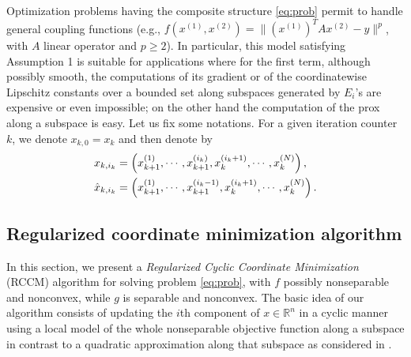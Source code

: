 \documentclass[lettersize,journal]{IEEEtran}
\newcommand{\xkik}{{x}_{k,i_{k}}}
\newcommand{\hxkik}{\hat{x}_{k,i_{k}}}
\begin{document}
\noindent  Optimization problems having the composite structure \eqref{eq:prob}
permit to handle general coupling functions (e.g.,  $f(x^{(1)}, x^{(2)})= \|(x^{(1)})^TA x^{(2)} - y\|^p$, with $A$ linear operator and $p\geq 2$). In particular, this model satisfying Assumption 1 is suitable for applications where for the first term, although possibly smooth, the computations of its gradient or of the coordinatewise Lipschitz constants over a bounded set along  subspaces generated by $E_i$'s are expensive or even impossible; on the other hand the computation of the prox  along a subspace is easy.  Let us fix some notations.  For a given iteration counter $k$, we denote $x_{k,0} = x_{k}$ and then denote by
    \vspace{-0.2cm}
    \begin{align*}
    & \xkik= \left(x_{k+1}^{(1)},\cdots,x_{k+1}^{(i_{k})},x_{k}^{(i_{k}+1)}, \cdots, x_{k}^{(N)}\right),\\
   & \hxkik = \left(x_{k+1}^{(1)},\cdots,x_{k+1}^{(i_{k}-1)},x_{k}^{(i_{k}+1)}, \cdots, x_{k}^{(N)}\right).
    \vspace{-0.2cm}
    \end{align*}



\subsection{Regularized coordinate minimization algorithm}
\noindent In this section, we present a \textit{Regularized Cyclic Coordinate  Minimization}  (RCCM) algorithm for solving problem \eqref{eq:prob},  with $f$  possibly nonseparable and nonconvex, while $g$ is separable and nonconvex. The basic idea of our algorithm consists of updating  the $i$th component of  $x\in\mathbb{R}^{n}$   in a cyclic manner  using  a local model of the whole nonseparable  objective function along  a  subspace in contrast to a quadratic approximation along that subspace as considered in \cite{Teb:14}. 
\end{document}

